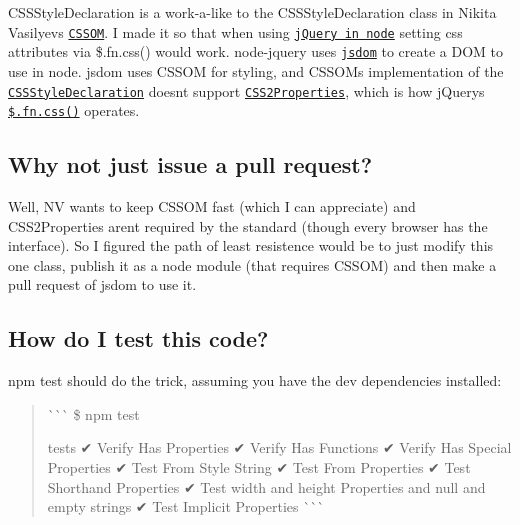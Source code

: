 C\+S\+S\+Style\+Declaration is a work-\/a-\/like to the C\+S\+S\+Style\+Declaration class in Nikita Vasilyev\textquotesingle{}s \href{https://github.com/NV/CSSOM}{\tt C\+S\+S\+OM}. I made it so that when using \href{https://github.com/tmtk75/node-jquery}{\tt j\+Query in node} setting css attributes via \$.fn.\+css() would work. node-\/jquery uses \href{https://github.com/tmpvar/jsdom}{\tt jsdom} to create a D\+OM to use in node. jsdom uses C\+S\+S\+OM for styling, and C\+S\+S\+OM\textquotesingle{}s implementation of the \href{http://www.w3.org/TR/DOM-Level-2-Style/css.html#CSS-CSSStyleDeclaration}{\tt C\+S\+S\+Style\+Declaration} doesn\textquotesingle{}t support \href{http://www.w3.org/TR/DOM-Level-2-Style/css.html#CSS-CSS2Properties}{\tt C\+S\+S2\+Properties}, which is how j\+Query\textquotesingle{}s \href{http://api.jquery.com/css/}{\tt \$.fn.\+css()} operates.

\subsection*{Why not just issue a pull request? }

Well, NV wants to keep C\+S\+S\+OM fast (which I can appreciate) and C\+S\+S2\+Properties aren\textquotesingle{}t required by the standard (though every browser has the interface). So I figured the path of least resistence would be to just modify this one class, publish it as a node module (that requires C\+S\+S\+OM) and then make a pull request of jsdom to use it.

\subsection*{How do I test this code? }

{\ttfamily npm test} should do the trick, assuming you have the dev dependencies installed\+: \begin{quote}
\`{}\`{}\`{} \$ npm test

tests ✔ Verify Has Properties ✔ Verify Has Functions ✔ Verify Has Special Properties ✔ Test From Style String ✔ Test From Properties ✔ Test Shorthand Properties ✔ Test width and height Properties and null and empty strings ✔ Test Implicit Properties \`{}\`{}\`{}\end{quote}
